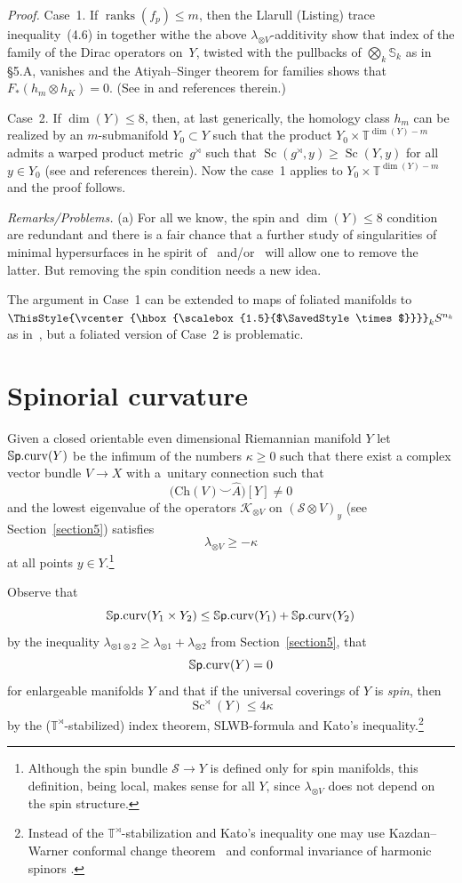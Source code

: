 \documentclass[pdftex]{sigma}
\numberwithin{equation}{section}
\newcommand\bigtimes{\mathbin{\ThisStyle{\vcenter{\hbox{%
\scalebox{1.5}{$\SavedStyle\times$}}}}}}
\begin{document}
 {\it Proof.} Case~1. If $\operatorname{ranks}(f_p)\leq m$, then the Llarull (Listing) trace inequality~(4.6) in \cite{Ll1998} together withe the above $\lambda_{\otimes V}$-additivity show that index of the family of the Dirac operators on~$Y$, twisted with the pullbacks of $\bigotimes_k \mathbb S_k$ as in \S5.A, vanishes and the Atiyah--Singer theorem for families shows that $F_\ast(h_m\otimes h_K)=0$. (See in \cite[\S4]{Gr2021} and references therein.)

 Case~2. If $\dim(Y)\leq 8$, then, at last generically, the homology class
 $h_m$ can be realized by an $m$-submanifold $Y_0\subset Y $ such that the product $Y_0\times \mathbb T^{\dim(Y)-m}$ admits a warped product metric~$g^\rtimes $ such that $\operatorname{Sc} (g^\rtimes, y)\geq \operatorname{Sc} (Y,y)$
 for all $y\in Y_0$ (see \cite[\S3]{Gr2023} and references therein).
 Now the case~1 applies to $Y_0\times \mathbb T^{\dim(Y)-m}$ and the proof follows.

{\it Remarks/Problems.} (a) For all we know, the spin and $\dim(Y)\leq 8$ condition are redundant and there is a fair chance that a further study of singularities of minimal hypersurfaces in he spirit of~\cite{SY2017} and/or~\cite{Lo2018,Lo2018a} will allow one to remove the latter. But removing the spin condition needs a new idea.

The argument in Case~1 can be extended to maps of foliated manifolds to $\bigtimes_k S^{n_k}$ as in~\cite{SWZ2021}, but a foliated version of Case~2 is problematic.

\section{Spinorial curvature}\label{section7}

Given a closed orientable even dimensional Riemannian manifold $Y$ let
$\mathbb S{\sf p}.\mathrm{curv}(Y)$ be the infimum of the numbers $\kappa\geq 0$ such that
there exist
a complex vector bundle $V\to X$ with a~unitary connection such that
\[
\bigl(\mathrm{Ch}(V)\smile \hat A\bigr)[Y]\neq 0
\]
 and
 the lowest eigenvalue of the operators $\mathcal K_{\otimes V}$ on $(\mathcal S\otimes V)_y$ (see Section~\ref{section5}) satisfies
\[
\lambda_{\otimes V}\geq -\kappa
\]
 at all points $y\in Y$.\footnote{Although the spin bundle $\mathcal S\to Y$ is defined only for spin manifolds, this
definition, being local, makes sense for all $Y$, since $\lambda_{\otimes V}$ does not depend on the spin structure.}

Observe that
\[
\mathbb S\mbox{\sf p}.{\rm curv}(Y_1\times Y_2)\leq \mathbb S\mbox{\sf p}.{\rm curv}(Y_1)+ \mathbb S\mbox{\sf p}.{\rm curv}( Y_2)
\]
 by
the inequality $\lambda_{\otimes 1\otimes 2}\geq \lambda_{\otimes 1}+\lambda_{\otimes 2} $
from Section~\ref{section5},
 that
\[
\mathbb S\mbox{\sf p}.{\rm curv}(Y)=0
\]
for enlargeable manifolds $Y$
and that if the universal coverings of $Y$ is {\it spin}, then
\[
\operatorname{Sc}^\rtimes(Y)\leq 4\kappa
\]
by the ($\mathbb T^\rtimes$-stabilized) index theorem, SLWB-formula and Kato's inequality.\footnote{Instead of the $\mathbb T^\rtimes$-stabilization and Kato's inequality one may use Kazdan--Warner conformal change theorem~\cite{KW1975} and conformal invariance of harmonic spinors \cite{Hi1974}.}
\end{document}
